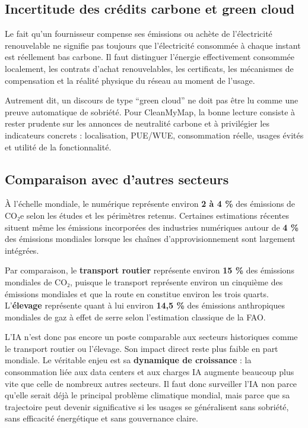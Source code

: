 \documentclass[
  10pt,
  a4paper,
  DIV=11,
  numbers=noendperiod,
  oneside]{scrreprt}
\let\oldtextbf\textbf
\renewcommand{\textbf}[1]{\oldtextbf{\textcolor{cmmnavy}{#1}}}
\begin{document}
\subsection{Incertitude des crédits carbone et green
cloud}\label{incertitude-des-cruxe9dits-carbone-et-green-cloud}

Le fait qu'un fournisseur compense ses émissions ou achète de
l'électricité renouvelable ne signifie pas toujours que l'électricité
consommée à chaque instant est réellement bas carbone. Il faut
distinguer l'énergie effectivement consommée localement, les contrats
d'achat renouvelables, les certificats, les mécanismes de compensation
et la réalité physique du réseau au moment de l'usage.

Autrement dit, un discours de type ``green cloud'' ne doit pas être lu
comme une preuve automatique de sobriété. Pour CleanMyMap, la bonne
lecture consiste à rester prudente sur les annonces de neutralité
carbone et à privilégier les indicateurs concrets : localisation,
PUE/WUE, consommation réelle, usages évités et utilité de la
fonctionnalité.

\subsection{Comparaison avec d'autres
secteurs}\label{comparaison-avec-dautres-secteurs}

À l'échelle mondiale, le numérique représente environ \textbf{2 à 4 \%}
des émissions de CO₂e selon les études et les périmètres retenus.
Certaines estimations récentes situent même les émissions incorporées
des industries numériques autour de \textbf{4 \%} des émissions
mondiales lorsque les chaînes d'approvisionnement sont largement
intégrées.

Par comparaison, le \textbf{transport routier} représente environ
\textbf{15 \%} des émissions mondiales de CO₂, puisque le transport
représente environ un cinquième des émissions mondiales et que la route
en constitue environ les trois quarts. L'\textbf{élevage} représente
quant à lui environ \textbf{14,5 \%} des émissions anthropiques
mondiales de gaz à effet de serre selon l'estimation classique de la
FAO.

L'IA n'est donc pas encore un poste comparable aux secteurs historiques
comme le transport routier ou l'élevage. Son impact direct reste plus
faible en part mondiale. Le véritable enjeu est sa \textbf{dynamique de
croissance} : la consommation liée aux data centers et aux charges IA
augmente beaucoup plus vite que celle de nombreux autres secteurs. Il
faut donc surveiller l'IA non parce qu'elle serait déjà le principal
problème climatique mondial, mais parce que sa trajectoire peut devenir
significative si les usages se généralisent sans sobriété, sans
efficacité énergétique et sans gouvernance claire.
\end{document}
